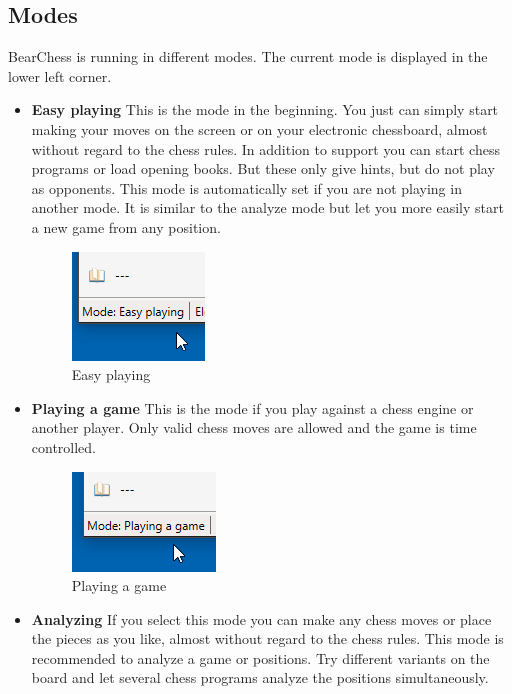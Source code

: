 \documentclass[11pt,a4paper]{article}
\begin{document}
\subsection{Modes}
BearChess is running in different modes. The current mode is displayed in the lower left corner.
\begin{itemize}
	
	\item \textbf{Easy playing} This is the mode in the beginning. You just can simply start making your moves on the screen or on your electronic chessboard, almost without regard to the chess rules. In addition to support you can start chess programs or load opening books. But these only give hints, but do not play as opponents. This mode is automatically set if you are not playing in another mode. It is similar to the analyze mode but let you more easily start a new game from any position.
	\begin{figure}[H]
		\centering
		\includegraphics[scale=1.0]{ModeEasyPlaying.png}
		\caption{Easy playing}
		\label{fig:ModeEasyPlaying}
	\end{figure}
	\item \textbf{Playing a game} This is the mode if you play against a chess engine or another player. Only valid chess moves are allowed and the game is time controlled.
	\begin{figure}[H]
		\centering
		\includegraphics[scale=1.0]{ModePlayingAGame.png}
		\caption{Playing a game}
		\label{fig:ModePlayingAGame}
	\end{figure}
	\item \textbf{Analyzing} If you select this mode you can make any chess moves or place the pieces as you like, almost without regard to the chess rules. This mode is recommended to analyze a game or positions. Try different variants on the board and let several chess programs analyze the positions simultaneously. 
	\begin{figure}[H]

\end{figure}
\end{itemize}
\end{document}
